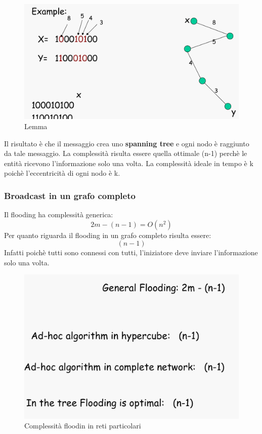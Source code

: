 \documentclass[12pt]{article}
\begin{document}
			\begin{figure}[h!]
				\centering
				\includegraphics[scale=0.20]{img/hyper3.png}
				\caption{Lemma}
			\end{figure}
			Il risultato è che il messaggio crea uno \textbf{spanning tree} e ogni nodo è raggiunto da tale messaggio. La complessità risulta essere quella ottimale (n-1) perchè le entità ricevono l'informazione solo una volta. La complessità ideale in tempo è k poichè l'eccentricità di ogni nodo è k.
		\subsubsection{Broadcast in un grafo completo}
			Il flooding ha complessità generica:
			$$2m-(n-1)=O(n^{2}) $$ 
			Per quanto riguarda il flooding in un grafo completo risulta essere:
			$$(n-1) $$
			Infatti poichè tutti sono connessi con tutti, l'iniziatore deve inviare l'informazione solo una volta.
		\begin{figure}[h!]
			\centering
			\includegraphics[scale=0.3]{img/flo.png}
			\caption{Complessità floodin in reti particolari}
		\end{figure}
\end{document}
